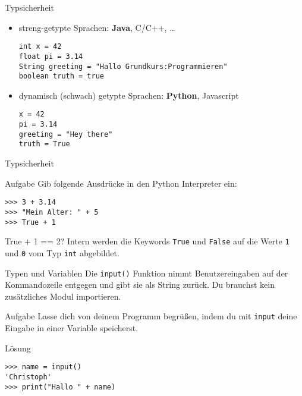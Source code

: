 \begin{frame}[fragile]{Typsicherheit}
 \begin{itemize}
    \item streng-getypte Sprachen: \textbf{Java}, C/C++, \dots
    \begin{lstlisting}
int x = 42
float pi = 3.14
String greeting = "Hallo Grundkurs:Programmieren"
boolean truth = true
    \end{lstlisting}
    \item dynamisch (schwach) getypte Sprachen: \textbf{Python}, Javascript
    \begin{lstlisting}
x = 42
pi = 3.14
greeting = "Hey there"
truth = True
    \end{lstlisting}
\end{itemize}   
\end{frame}

\begin{frame}[fragile]{Typsicherheit}
\begin{block}{Aufgabe}
Gib folgende Ausdrücke in den Python Interpreter ein:
\begin{lstlisting}
>>> 3 + 3.14
>>> "Mein Alter: " + 5
>>> True + 1
\end{lstlisting}
\end{block}
\pause{}
\begin{exampleblock}{True + 1 == 2?}
Intern werden die Keywords \lstinline{True} und \lstinline{False} auf die 
Werte \texttt{1} und \texttt{0} vom Typ \texttt{int} abgebildet.
\end{exampleblock}

\end{frame}


\begin{frame}[fragile]{Typen und Variablen}
    Die \lstinline{input()} Funktion nimmt Benutzereingaben auf der Kommandozeile 
    entgegen und gibt sie als String zurück. Du brauchst kein zusätzliches Modul importieren.
    \begin{block}{Aufgabe}
       Lasse dich von deinem Programm begrüßen, indem du mit \texttt{input} deine 
       Eingabe in einer Variable speicherst.
    \end{block}
    \pause{}
    \begin{exampleblock}{Lösung}
        \begin{lstlisting}
>>> name = input()
'Christoph'
>>> print("Hallo " + name)
        \end{lstlisting}
    \end{exampleblock}
\end{frame}

